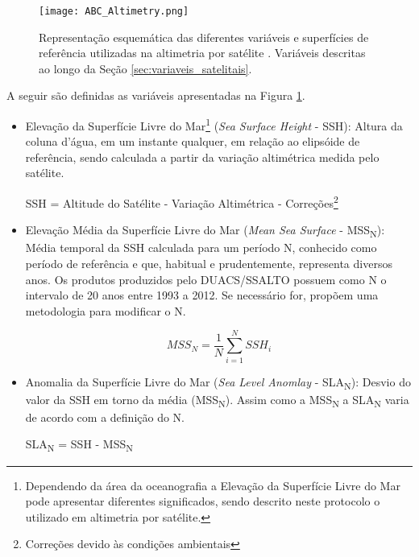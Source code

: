 \documentclass[12pt]{article}
\begin{document}
	\begin{figure}[H]%
		\centering
		\texttt{[image: ABC\_Altimetry.png]}
   		\caption{Representação esquemática das diferentes variáveis e superfícies de referência utilizadas na altimetria por satélite \citep{taburet_etal2021}. Variáveis descritas ao longo da Seção \ref{sec:variaveis_satelitais}.
    	\label{fig:variaveis_altimetria}}
	\end{figure}
	
	\par A seguir são definidas as variáveis apresentadas na Figura \ref{fig:variaveis_altimetria}.

	\begin{itemize}
		\item Elevação da Superfície Livre do Mar\footnote[1]{Dependendo da área da oceanografia a Elevação da Superfície Livre do Mar pode apresentar diferentes significados, sendo descrito neste protocolo o utilizado em altimetria por satélite.} (\textit{Sea Surface Height} - SSH): Altura da coluna d'água, em um instante qualquer, em relação ao elipsóide de referência, sendo calculada a partir da variação altimétrica medida pelo satélite.
		
		\begin{center}
			SSH = Altitude do Satélite - Variação Altimétrica - Correções\footnote[2]{Correções devido às condições ambientais}
		\end{center}
		
		\item Elevação Média da Superfície Livre do Mar (\textit{Mean Sea Surface} - MSS\textsubscript{N}): Média temporal da SSH calculada para um período N, conhecido como período de referência e que, habitual e prudentemente, representa diversos anos. Os produtos produzidos pelo DUACS/SSALTO possuem como N o intervalo de 20 anos entre 1993 a 2012. Se necessário for, \citet{pujol_etal2016} propõem uma metodologia para modificar o N.

		\[MSS_N = \frac{1}{N} \sum_{i=1}^{N} SSH_i \]	
		
		\item Anomalia da Superfície Livre do Mar (\textit{Sea Level Anomlay} - SLA\textsubscript{N}): Desvio do valor da SSH em torno da média (MSS\textsubscript{N}). Assim como a MSS\textsubscript{N} a SLA\textsubscript{N} varia de acordo com a definição do N.
		
		\begin{center}
			SLA\textsubscript{N} = SSH - MSS\textsubscript{N}
		\end{center}	
		

\end{itemize}
\end{document}
